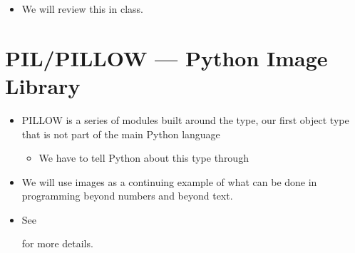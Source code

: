 \documentclass[letterpaper,10pt,english]{sphinxmanual}
\begin{document}
\begin{itemize}
\begin{sphinxVerbatim}[commandchars=\\\{\}]
  
  
         
     
         
\end{sphinxVerbatim}

\item {} 
We will review this in class.

\end{itemize}


\section{PIL/PILLOW — Python Image Library}
\label{\detokenize{lecture_notes/lec07_modules_images:pil-pillow-python-image-library}}\begin{itemize}
\item {} 
PILLOW is a series of modules built around the  type, our first
object type that is not part of the main Python language
\begin{itemize}
\item {} 
We have to tell Python about this type through 

\end{itemize}

\item {} 
We will use images as a continuing example of what can be done in
programming beyond numbers and beyond text.

\item {} 
See


for more details.

\end{itemize}
\end{document}
